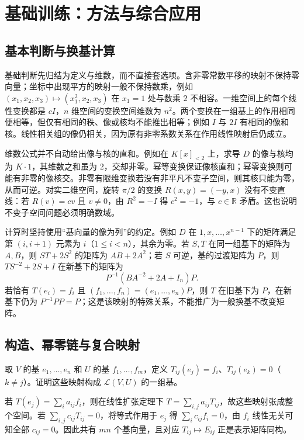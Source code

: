 \section{基础训练：方法与综合应用}
\label{sec:xie-ex-linear-training}

\subsection{基本判断与换基计算}

基础判断先归结为定义与维数，而不直接套选项。含非零常数平移的映射不保持零向量；坐标中出现平方的映射一般不保持数乘，例如 $(x_1,x_2,x_3)\mapsto(x_1^2,x_2,x_3)$ 在 $x_1=1$ 处与数乘 $2$ 不相容。一维空间上的每个线性变换都是 $cI$，$n$ 维空间的变换空间维数为 $n^2$。两个变换在一组基上的作用相同便相等，但仅有相同的秩、像或核均不能推出相等；例如 $I$ 与 $2I$ 有相同的像和核。线性相关组的像仍相关，因为原有非零系数关系在作用线性映射后仍成立。

维数公式并不自动给出像与核的直和。例如在 $K[x]_{<2}$ 上，求导 $D$ 的像与核均为 $K\cdot1$，其维数之和虽为 $2$，交却非零。幂等变换保证像核直和；幂零变换则可能有非零的像核交。非零有限维变换若没有非平凡不变子空间，则其核只能为零，从而可逆。对实二维空间，旋转 $\pi/2$ 的变换 $R(x,y)=(-y,x)$ 没有不变直线：若 $R(v)=cv$ 且 $v\ne0$，由 $R^2=-I$ 得 $c^2=-1$，与 $c\in\mathbb R$ 矛盾。这也说明不变子空间问题必须明确数域。

计算时坚持使用“基向量的像为列”的约定。例如 $D$ 在 $1,x,\ldots,x^{n-1}$ 下的矩阵满足第 $(i,i+1)$ 元素为 $i$（$1\leq i<n$），其余为零。若 $S,T$ 在同一组基下的矩阵为 $A,B$，则 $ST+2S^2$ 的矩阵为 $AB+2A^2$；若 $S$ 可逆，基的过渡矩阵为 $P$，则 $TS^{-2}+2S+I$ 在新基下的矩阵为
\[
    P^{-1}(BA^{-2}+2A+I_n)P.
\]
若恰有 $T(e_i)=f_i$ 且 $(f_1,\ldots,f_n)=(e_1,\ldots,e_n)P$，则 $T$ 在旧基下为 $P$，在新基下仍为 $P^{-1}PP=P$；这是该映射的特殊关系，不能推广为一般换基不改变矩阵。

\subsection{构造、幂零链与复合映射}

\begin{example}
\label{ex:xie-ex-map-space-basis}
取 $V$ 的基 $e_1,\ldots,e_n$ 和 $U$ 的基 $f_1,\ldots,f_m$，定义 $T_{ij}(e_j)=f_i$、$T_{ij}(e_k)=0$（$k\ne j$）。证明这些映射构成 $\mathcal L(V,U)$ 的一组基。
\end{example}

\begin{solve}
若 $T(e_j)=\sum_i a_{ij}f_i$，则在线性扩张定理下 $T=\sum_{i,j}a_{ij}T_{ij}$，故这些映射张成整个空间。若 $\sum_{i,j}c_{ij}T_{ij}=0$，将等式作用于 $e_j$ 得 $\sum_ic_{ij}f_i=0$，由 $f_i$ 线性无关可知全部 $c_{ij}=0$。因此共有 $mn$ 个基向量，且对应 $T_{ij}\mapsto E_{ij}$ 正是表示矩阵同构。
\end{solve}

